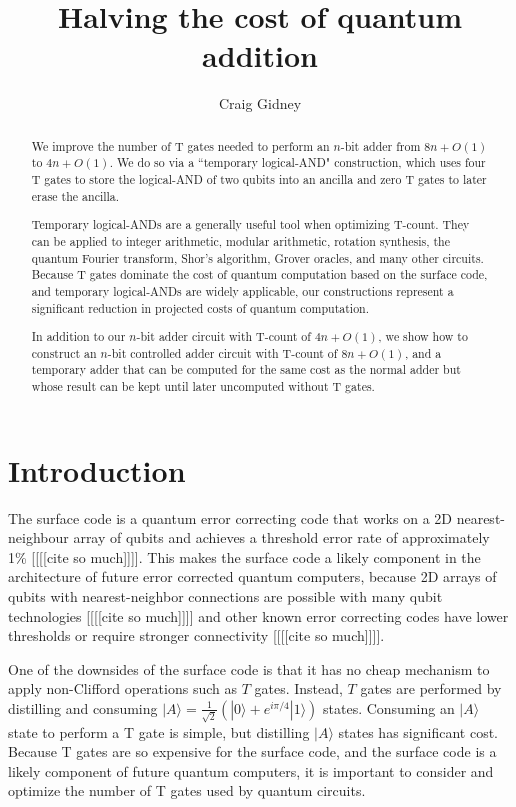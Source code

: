 \documentclass[twocolumn,longbibliography]{quantumarticle-customized}
\title{Halving the cost of quantum addition}
\author{Craig Gidney}
\affiliation{Google, Santa Barbara, CA 93117, USA}
\begin{document}
\maketitle

\begin{abstract}
We improve the number of T gates needed to perform an $n$-bit adder from $8n + O(1)$ \cite{Amy2013, Cuccaro2004, AustinDiscussionsAndEmails2017} to $4n + O(1)$.
We do so via a ``temporary logical-AND" construction, which uses four T gates to store the logical-AND of two qubits into an ancilla and zero T gates to later erase the ancilla.

Temporary logical-ANDs are a generally useful tool when optimizing T-count.
They can be applied to integer arithmetic, modular arithmetic, rotation synthesis, the quantum Fourier transform, Shor's algorithm, Grover oracles, and many other circuits.
Because T gates dominate the cost of quantum computation based on the surface code, and temporary logical-ANDs are widely applicable, our constructions represent a significant reduction in projected costs of quantum computation.

In addition to our $n$-bit adder circuit with T-count of $4n + O(1)$, we show how to construct an $n$-bit controlled adder circuit with T-count of $8n + O(1)$, and a temporary adder that can be computed for the same cost as the normal adder but whose result can be kept until later uncomputed without T gates.
\end{abstract}


\section{Introduction}
\label{sec:introduction}

The surface code is a quantum error correcting code that works on a 2D nearest-neighbour array of qubits and achieves a threshold error rate of approximately 1\% [[[[cite so much]]]].
This makes the surface code a likely component in the architecture of future error corrected quantum computers, because 2D arrays of qubits with nearest-neighbor connections are possible with many qubit technologies [[[[cite so much]]]] and other known error correcting codes have lower thresholds or require stronger connectivity [[[[cite so much]]]].

One of the downsides of the surface code is that it has no cheap mechanism to apply non-Clifford operations such as $T$ gates.
Instead, $T$ gates are performed by distilling and consuming $|A\rangle = \frac{1}{\sqrt{2}} (|0\rangle + e^{i \pi/4} |1\rangle)$ states.
Consuming an $|A\rangle$ state to perform a T gate is simple, but distilling $|A\rangle$ states has significant cost.
Because T gates are so expensive for the surface code, and the surface code is a likely component of future quantum computers, it is important to consider and optimize the number of T gates used by quantum circuits.
\end{document}
